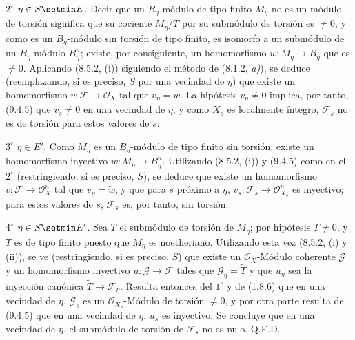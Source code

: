 $2^\circ$ $\eta\in S\setmin E$. Decir que un $B_\eta$-módulo de tipo finito $M_\eta$
no es un módulo de torsión significa que su cociente $M_\eta/T$ por su
submódulo de torsión es $\neq0$, y como es un $B_\eta$-módulo sin
torsión de tipo finito, es isomorfo a un submódulo de un $B_\eta$-módulo
$B_\eta^n$; existe, por consiguiente, un homomorfismo
$w:M_\eta\to B_\eta$ que es $\neq0$. Aplicando (8.5.2, (i)) siguiendo el
método de (8.1.2, \emph{a)}), se deduce (reemplazando, si es preciso, $S$ por una
vecindad de $\eta$) que existe un homomorfismo
$v:\mathcal F\to\mathcal O_X$ tal que $v_\eta=\widetilde w$. La hipótesis
$v_\eta\neq0$ implica, por tanto, (9.4.5) que $v_s\neq0$ en una vecindad de
$\eta$, y como $X_s$ es localmente íntegro, $\mathcal F_s$ no es de
torsión para estos valores de $s$.

$3^\circ$ $\eta\in E'$. Como $M_\eta$ es un $B_\eta$-módulo de tipo finito
sin torsión, existe un homomorfismo inyectivo
$w:M_\eta\to B_\eta^n$. Utilizando (8.5.2, (i)) y (9.4.5) como en el
$2^\circ$ (restringiendo, si es preciso, $S$), se deduce que existe un
homomorfismo $v:\mathcal F\to\mathcal O_X^n$ tal que $v_\eta=\widetilde w$,
y que para $s$ próximo a $\eta$,
$v_s:\mathcal F_s\to\mathcal O_{X_s}^n$ es inyectivo; para estos valores de
$s$, $\mathcal F_s$ es, por tanto, sin torsión.

$4^\circ$ $\eta\in S\setmin E'$. Sea $T$ el submódulo de torsión de $M_\eta$;
por hipótesis $T\neq0$, y $T$ es de tipo finito puesto que $M_\eta$ es
noetheriano. Utilizando esta vez (8.5.2, (i) y (ii)), se ve (restringiendo,
si es preciso, $S$) que existe un $\mathcal O_X$-Módulo coherente $\mathcal G$ y
un homomorfismo inyectivo $u:\mathcal G\to\mathcal F$ tales que
$\mathcal G_\eta=\widetilde T$ y que $u_\eta$ sea la inyección canónica
$\widetilde T\to\mathcal F_\eta$. Resulta entonces del $1^\circ$ y de (1.8.6)
que en una vecindad de $\eta$, $\mathcal G_s$ es un
$\mathcal O_{X_s}$-Módulo de torsión $\neq0$, y por otra parte resulta de
(9.4.5) que en una vecindad de $\eta$, $u_s$ es inyectivo. Se concluye que
en una vecindad de $\eta$, el submódulo de torsión de $\mathcal F_s$ no es
nulo. Q.E.D.

